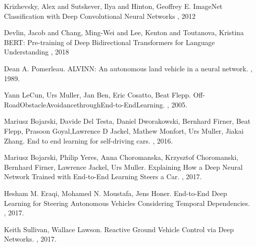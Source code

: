 
  


\begin{thebibliography}{1}


Krizhevsky, Alex and Sutskever, Ilya and Hinton, Geoffrey E.
\newblock ImageNet Classification with Deep Convolutional Neural Networks
, 2012

Devlin, Jacob and Chang, Ming-Wei and Lee, Kenton and Toutanova, Kristina
\newblock BERT: Pre-training of Deep Bidirectional Transformers for Language Understanding
, 2018

Dean A. Pomerleau.
\newblock ALVINN: An autonomous land vehicle in a neural network.
, 1989.

Yann LeCun, Urs Muller, Jan Ben, Eric Cosatto, Beat Flepp.
\newblock Off-RoadObstacleAvoidancethroughEnd-to-EndLearning.
, 2005.

Mariusz Bojarski, Davide Del Testa, Daniel Dworakowski, Bernhard Firner, Beat Flepp, Prasoon Goyal,Lawrence D Jackel, Mathew Monfort, Urs Muller, Jiakai Zhang.
\newblock End  to  end  learning  for  self-driving  cars.
, 2016.

Mariusz Bojarski, Philip Yeres, Anna Choromanska, Krzysztof Choromanski, Bernhard Firner, Lawrence Jackel, Urs Muller. 
\newblock Explaining How a Deep Neural Network Trained with End-to-End Learning Steers a Car.
, 2017.

Hesham M. Eraqi, Mohamed N. Moustafa, Jens Honer.
\newblock End-to-End Deep Learning for Steering Autonomous Vehicles Considering Temporal Dependencies.
, 2017.

Keith Sullivan, Wallace Lawson.
\newblock Reactive Ground Vehicle Control via Deep Networks.
, 2017.


\end{thebibliography}
